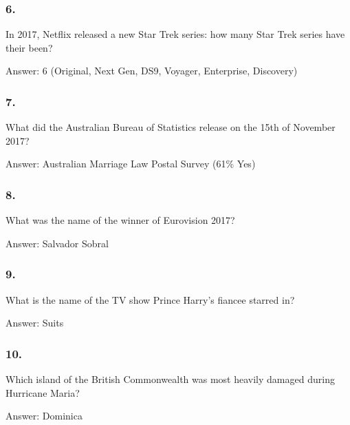 \documentclass{beamer}
\begin{document}
    \begin{frame}
        \frametitle{6.}
        In 2017, Netflix released a new Star Trek series: how many Star Trek
        series have their been?\\

        \begin{center}
            Answer: 6 (Original, Next Gen, DS9, Voyager, Enterprise, Discovery)
        \end{center}
    \end{frame}

    \begin{frame}
        \frametitle{7.}
        What did the Australian Bureau of Statistics release on the 15th of
        November 2017?\\

        \begin{center}
            Answer: Australian Marriage Law Postal Survey (61\% Yes)
        \end{center}
    \end{frame}

    \begin{frame}
        \frametitle{8.}
        What was the name of the winner of Eurovision 2017?\\

        \begin{center}
            Answer: Salvador Sobral
        \end{center}
    \end{frame}

    \begin{frame}
        \frametitle{9.}
        What is the name of the TV show Prince Harry's fiancee starred in?\\

        \begin{center}
            Answer: Suits
        \end{center}
    \end{frame}

    \begin{frame}
        \frametitle{10.}
        Which island of the British Commonwealth was most heavily damaged
        during Hurricane Maria?\\

        \begin{center}
            Answer: Dominica
        \end{center}
    \end{frame}
\end{document}
